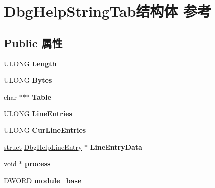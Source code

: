 \hypertarget{struct_dbg_help_string_tab}{}\section{Dbg\+Help\+String\+Tab结构体 参考}
\label{struct_dbg_help_string_tab}
\subsection*{Public 属性}
\begin{DoxyCompactItemize}
\item 
\mbox{\label{struct_dbg_help_string_tab_ace948ff2de5735ec033c454f2b0d5183}} 
U\+L\+O\+NG {\bfseries Length}
\item 
\mbox{\label{struct_dbg_help_string_tab_a5661b28ae7195a000ed5d73d3b92c7c8}} 
U\+L\+O\+NG {\bfseries Bytes}
\item 
\mbox{\label{struct_dbg_help_string_tab_aacdbb84a46ad91641ad4788ffb40309a}} 
char $\ast$$\ast$$\ast$ {\bfseries Table}
\item 
\mbox{\label{struct_dbg_help_string_tab_aa99ea2bf45f161f75f081088a8e71cf1}} 
U\+L\+O\+NG {\bfseries Line\+Entries}
\item 
\mbox{\label{struct_dbg_help_string_tab_a2e7b9036d3e449f06a0e5dae11a00fe8}} 
U\+L\+O\+NG {\bfseries Cur\+Line\+Entries}
\item 
\mbox{\label{struct_dbg_help_string_tab_ad1cd07e2df6fa0d15d3d566d1117f84c}} 
\hyperlink{interfacestruct}{struct} \hyperlink{struct_dbg_help_line_entry}{Dbg\+Help\+Line\+Entry} $\ast$ {\bfseries Line\+Entry\+Data}
\item 
\mbox{\label{struct_dbg_help_string_tab_a0e1025ba3ca04dbd897453a630eb8df9}} 
\hyperlink{interfacevoid}{void} $\ast$ {\bfseries process}
\item 
\mbox{\label{struct_dbg_help_string_tab_a40f59b4b282f3a684dfc2a6c7efb87d3}} 
D\+W\+O\+RD {\bfseries module\+\_\+base}
\item 

\end{DoxyCompactItemize}
